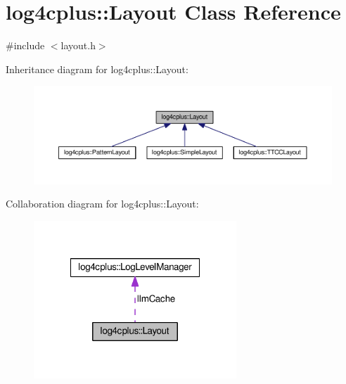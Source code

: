 \hypertarget{classlog4cplus_1_1Layout}{\section{log4cplus\-:\-:Layout Class Reference}
\label{classlog4cplus_1_1Layout}
}


{\ttfamily \#include $<$layout.\-h$>$}



Inheritance diagram for log4cplus\-:\-:Layout\-:
\nopagebreak
\begin{figure}[H]
\begin{center}
\leavevmode
\includegraphics[width=350pt]{classlog4cplus_1_1Layout__inherit__graph}
\end{center}
\end{figure}


Collaboration diagram for log4cplus\-:\-:Layout\-:
\nopagebreak
\begin{figure}[H]
\begin{center}
\leavevmode
\includegraphics[width=216pt]{classlog4cplus_1_1Layout__coll__graph}
\end{center}
\end{figure}
